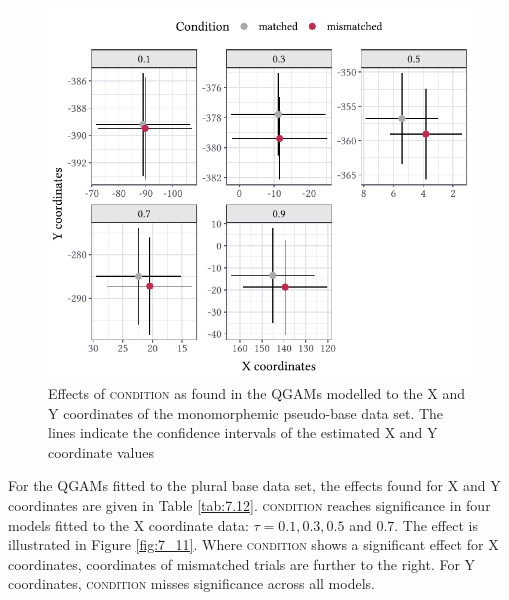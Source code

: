\begin{figure}
    \centering
    \includegraphics[]{figures/fig7.10.pdf}
    \caption{Effects of \textsc{condition} as found in the QGAMs modelled to the X and Y coordinates of the monomorphemic pseudo-base data set. The lines indicate the confidence intervals of the estimated X and Y coordinate values}
    \label{fig:7_10}
\end{figure}

For the QGAMs fitted to the plural base data set, the effects found for X and Y coordinates are given in Table \ref{tab:7.12}. \textsc{condition} reaches significance in four models fitted to the X coordinate data: $\tau=0.1,0.3,0.5$ and $0.7$. The effect is illustrated in Figure \ref{fig:7_11}. Where \textsc{condition} shows a significant effect for X coordinates, coordinates of mismatched trials are further to the right. For Y coordinates, \textsc{condition} misses significance across all models.

